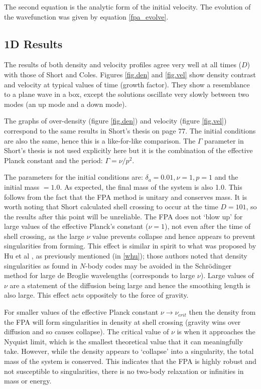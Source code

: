 \noindent The second equation is the analytic form of the initial velocity. The evolution of the wavefunction was given by equation \ref{fpa_evolve}.


\subsection{1D Results}
The results of both density and velocity profiles agree very well at all times ($D$) with those of Short and Coles. Figures \ref{fig.den} and \ref{fig.vel} show density contrast and velocity at typical values of time (growth factor). They show a resemblance to a plane wave in a box, except the solutions oscillate very slowly between two modes (an up mode and a down mode).

The graphs of over-density (figure \ref{fig.den}) and velocity (figure \ref{fig.vel}) correspond to the same results in Short's thesis on page 77. The initial conditions are also the same, hence this is a like-for-like comparison. The $\Gamma$ parameter in Short's thesis is not used explicitly here but it is the combination of the effective Planck constant and the period: $\Gamma = \nu/p^2$.

The parameters for the initial conditions are: $\delta_a = 0.01, \nu = 1, p = 1$ and the initial mass $= 1.0$. As expected, the final mass of the system is also 1.0. This follows from the fact that the FPA method is unitary and conserves mass. It is worth noting that Short calculated shell crossing to occur at the time $D = 101$, so the results after this point will be unreliable. The FPA does not `blow up' for large values of the effective Planck's constant ($\nu=1$), not even after the time of shell crossing, as the large $\nu$ value prevents collapse and hence appears to  prevent singularities from forming. This effect is similar in spirit to what was proposed by Hu et al \citep{bib_whu}, as previously mentioned (in \ref{whu}); those authors noted that density singularities as found in $N$-body codes may be avoided in the Schr\"odinger method for large de Broglie wavelengths (corresponds to large $\nu$). Large values of $\nu$ are a statement of the diffusion being large and hence the smoothing length is also large. This effect acts oppositely to the force of gravity.

For smaller values of the effective Planck constant $\nu \rightarrow \nu_{crit}$ then the density from the FPA will form singularities in density at shell crossing (gravity wins over diffusion and so causes collapse). The critical value of $\nu$ is when it approaches the Nyquist limit, which is the smallest theoretical value that it can meaningfully take. However, while the density appears to `collapse' into a singularity, the total mass of the system is conserved. This indicates that the FPA is highly robust and not susceptible to singularities, there is no two-body relaxation or infinities in mass or energy.

